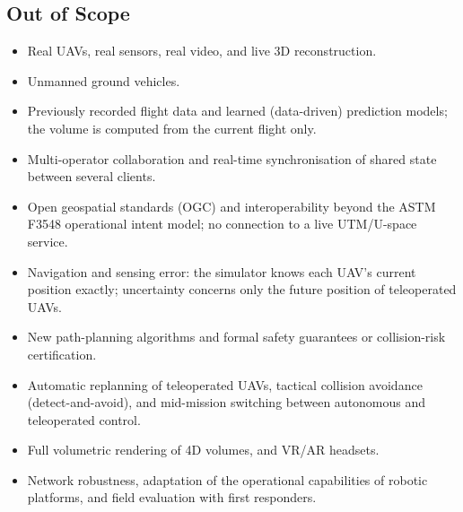 \documentclass{article}
\begin{document}
\subsection{Out of Scope}
\begin{itemize}
  \item Real UAVs, real sensors, real video, and live 3D reconstruction.
  \item Unmanned ground vehicles.
  \item Previously recorded flight data and learned (data-driven) prediction models; the volume is computed from the current flight only.
  \item Multi-operator collaboration and real-time synchronisation of shared state between several clients.
  \item Open geospatial standards (OGC) and interoperability beyond the ASTM F3548 operational intent model; no connection to a live UTM/U-space service.
  \item Navigation and sensing error: the simulator knows each UAV's current position exactly; uncertainty concerns only the future position of teleoperated UAVs.
  \item New path-planning algorithms and formal safety guarantees or collision-risk certification.
  \item Automatic replanning of teleoperated UAVs, tactical collision avoidance (detect-and-avoid), and mid-mission switching between autonomous and teleoperated control.
  \item Full volumetric rendering of 4D volumes, and VR/AR headsets.
  \item Network robustness, adaptation of the operational capabilities of robotic platforms, and field evaluation with first responders.
\end{itemize}

\newpage


\end{document}
